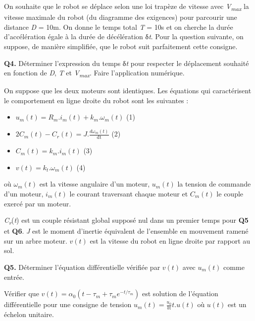 \documentclass[
]{article}
\begin{document}
On souhaite que le robot se déplace selon une loi trapèze de vitesse
avec \emph{V\textsubscript{max }}la vitesse maximale du robot (du
diagramme des exigences) pour parcourir une distance \emph{D} = 10m. On
donne le temps total \emph{T} = 10s et on cherche la durée
d'accélération égale à la durée de décélération δ\emph{t}. Pour la
question suivante, on suppose, de manière simplifiée, que le robot suit
parfaitement cette consigne.

\textbf{Q4.} Déterminer l'expression du temps δ\emph{t} pour respecter
le déplacement souhaité en fonction de \emph{D}, \emph{T} et
\emph{V\textsubscript{max}}. Faire l'application numérique.

On suppose que les deux moteurs sont identiques. Les équations qui
caractérisent le comportement en ligne droite du robot sont les
suivantes :

\begin{itemize}
\item
  \(u_{m}\left( t \right) = R_{m}.i_{m}\left( t \right) + k_{m}.\omega_{m}\left( t \right)\)
  (1)
\item
  \({2C}_{m}\left( t \right) - C_{r}\left( t \right) = J.\frac{d\omega_{m}\left( t \right)}{\text{dt}}\)
  (2)
\item
  \(C_{m}\left( t \right) = k_{m}.i_{m}\left( t \right)\) (3)
\item
  \(v\left( t \right) = k_{t}.\omega_{m}\left( t \right)\) (4)
\end{itemize}

où \(\omega_{m}\left( t \right)\) est la vitesse angulaire d'un moteur,
\(u_{m}\left( t \right)\) la tension de commande d'un moteur,
\(i_{m}\left( t \right)\) le courant traversant chaque moteur et
\(C_{m}\left( t \right)\) le couple exercé par un moteur.

\emph{C\textsubscript{r}}(\emph{t}) est un couple résistant global
supposé nul dans un premier temps pour \textbf{Q5} et \textbf{Q6}.
\emph{J} est le moment d'inertie équivalent de l'ensemble en mouvement
ramené sur un arbre moteur. \(v\left( t \right)\) est la vitesse du
robot en ligne droite par rapport au sol.

\textbf{Q5.} Déterminer l'équation différentielle vérifiée par
\(v\left( t \right)\) avec \(u_{m}\left( t \right)\) comme entrée.

Vérifier que
\(v\left( t \right) = \alpha_{0}(t - \tau_{m} + \tau_{m}e^{- t/\tau_{m}})\)
est solution de l'équation différentielle pour une consigne de tension
\(u_{m}\left( t \right) = \frac{u_{0}}{\text{δt}}t.u(t)\) où
\(u\left( t \right)\) est un échelon unitaire.
\end{document}
